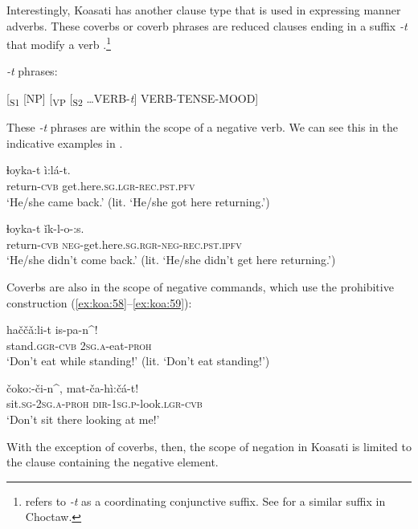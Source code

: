 \documentclass[output=paper,colorlinks,citecolor=brown]{langscibook}
\begin{document}
Interestingly, Koasati has another clause type that is used in expressing manner adverbs. These coverbs or coverb phrases are reduced clauses ending in a suffix \textit{-t} that modify a verb .\footnote{\citet[227]{Kimball1991} refers to \textit{{}-t} as a coordinating conjunctive suffix. See \citet{Broadwell2006} for a similar suffix in Choctaw.}


\ea\label{ex:koa:56}
    \textit{-t} phrases:
    
    [\textsubscript{S1} [NP] [\textsubscript{VP} [\textsubscript{S2} …VERB-\textit{t}] VERB-TENSE-MOOD]
\z 

These \textit{-t} phrases are within the scope of a negative verb. We can see this in the indicative examples in .


\ea\label{ex:koa:57}
    \ea\label{ex:koa:57a}
        \gll ɬoyka-t  ì:lá-t. \\ 
             return-\textsc{cvb}  get.here.\textsc{sg}.\textsc{lgr}-\textsc{rec.pst.pfv} \\
        \glt ‘He/she came back.’ (lit. ‘He/she got here returning.’)
    
    \ex\label{ex:koa:57b}
        \gll ɬoyka-t  ǐk-l-o-:s. \\
             return-\textsc{cvb}  \textsc{neg}-get.here.\textsc{sg}.\textsc{rgr}-\textsc{neg}-\textsc{rec.pst}.\textsc{ipfv} \\
        \glt ‘He/she didn’t come back.’ (lit. ‘He/she didn’t get here returning.’)
    \z
\z 
 
Coverbs are also in the scope of negative commands, which use the prohibitive construction (\ref{ex:koa:58}--\ref{ex:koa:59}):



\ea\label{ex:koa:58}
    \gll haččǎ:li-t  is-pa-n\^{}! \\ 
         stand.\textsc{ggr}-\textsc{cvb}  2\textsc{sg.a}-eat-\textsc{proh} \\
    \glt ‘Don’t eat while standing!’ (lit. ‘Don’t eat standing!’)
\z 

\ea\label{ex:koa:59}
    \gll čoko:-či-n\^{},  mat-ča-hì:čá-t! \\ 
         sit.\textsc{sg}-2\textsc{sg.a}-\textsc{proh}  \textsc{dir}-1\textsc{sg.p}-look.\textsc{lgr}-\textsc{cvb} \\
    \glt ‘Don’t sit there looking at me!’
\z 

With the exception of coverbs, then, the scope of negation in Koasati is limited to the clause containing the negative element.
\end{document}
